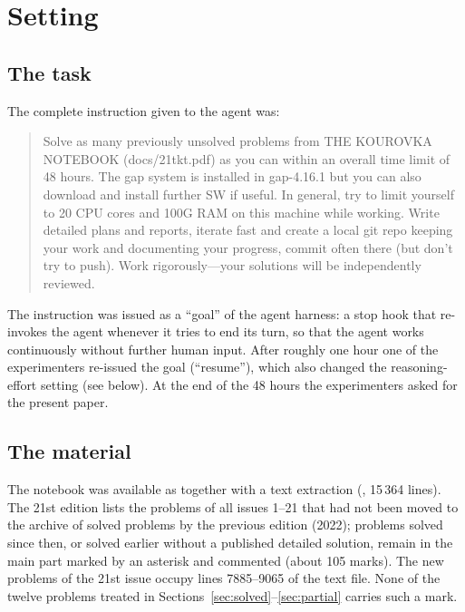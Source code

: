 \section{Setting}\label{sec:setting}

\subsection{The task}\label{sec:prompt}
The complete instruction given to the agent was:
\begin{quote}\small
Solve as many previously unsolved problems from THE KOUROVKA NOTEBOOK (docs/21tkt.pdf) as you can within an
overall time limit of 48 hours. The gap system is installed in gap-4.16.1 but you can also download and install
further SW if useful. In general, try to limit yourself to 20 CPU cores and 100G RAM on this machine while working.
Write detailed plans and reports, iterate fast and create a local git repo keeping your work and documenting your
progress, commit often there (but don't try to push). Work rigorously---your solutions will be independently
reviewed.
\end{quote}
The instruction was issued as a ``goal'' of the agent harness: a stop hook that re-invokes the agent whenever it
tries to end its turn, so that the agent works continuously without further human input. After roughly one hour one of the
experimenters re-issued the goal (``resume''), which also changed the reasoning-effort setting (see below). At the
end of the 48 hours the experimenters asked for the present paper.

\subsection{The material}
The notebook was available as  together with a text extraction (,
15\,364 lines). The 21st edition lists the problems of all issues 1--21 that had not been moved to the archive of solved problems
by the previous edition (2022); problems solved since then, or solved earlier without a published detailed
solution, remain in the main part marked by an asterisk and commented (about 105 marks). The new problems of the
21st issue occupy lines 7885--9065 of the text file. None of the twelve
problems treated in Sections~\ref{sec:solved}--\ref{sec:partial} carries such a mark.

